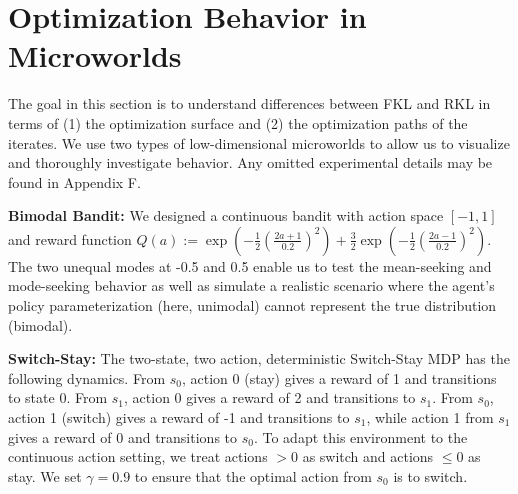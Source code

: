 \documentclass{article}
\newcommand{\policyparams}{\theta}
\newcommand{\martha}[1]{{\color{blue} #1 }}
\begin{document}


\section{Optimization Behavior in Microworlds}

The goal in this section is to understand differences between FKL and RKL in terms of (1) the optimization surface and (2) the optimization paths of the iterates. We use two types of low-dimensional microworlds to allow us to visualize and thoroughly investigate behavior. Any omitted experimental details may be found in Appendix F. 


\textbf{Bimodal Bandit:} We designed a continuous bandit with action space $[-1, 1]$ and reward function $Q(a) := \exp( -\tfrac{1}{2} (\tfrac{2 a + 1}{0.2})^2 ) + \tfrac{3}{2} \exp(-\tfrac{1}{2} (\tfrac{2 a - 1}{0.2})^2)$. The two unequal modes at -0.5 and 0.5 enable us to test the mean-seeking and mode-seeking behavior as well as simulate a realistic scenario where the agent's policy parameterization (here, unimodal) cannot represent the true distribution (bimodal). 

\textbf{Switch-Stay:} The two-state, two action, deterministic Switch-Stay MDP has the following dynamics. From $s_0$, action $0$ (stay) gives a reward of 1 and transitions to state $0$. From $s_1$, action 0 gives a reward of 2 and transitions to $s_1$. From $s_0$, action 1 (switch) gives a reward of -1 and transitions to $s_1$, while action 1 from $s_1$ gives a reward of 0 and transitions to $s_0$. 
To adapt this environment to the continuous action setting, we treat actions $> 0$ as switch and actions $\leq 0$ as stay.  We set $\gamma = 0.9$ to ensure that the optimal action from $s_0$ is to switch. 
\end{document}
